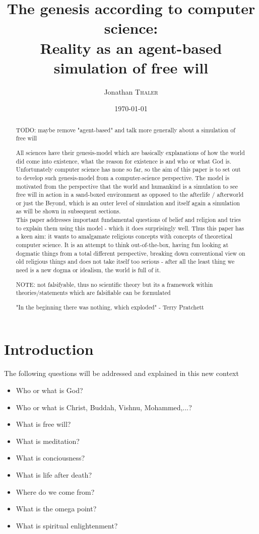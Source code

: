 \documentclass{article}
\title{The genesis according to computer science:\\Reality as an agent-based simulation of free will} %
\author{Jonathan \textsc{Thaler}} %
\date{\today} %
\begin{document}
\maketitle %

\begin{abstract}
TODO: maybe remove "agent-based" and talk more generally about a simulation of free will

All sciences have their genesis-model which are basically explanations of how the world did come into existence, what the reason for existence is and who or what God is. Unfortunately computer science has none so far, so the aim of this paper is to set out to develop such genesis-model from a computer-science perspective. The model is motivated from the perspective that the world and humankind is a simulation to see free will in action in a sand-boxed environment as opposed to the afterlife / afterworld or just the Beyond, which is an outer level of simulation and itself again a simulation as will be shown in subsequent sections. \\
This paper addresses important fundamental questions of belief and religion and tries to explain them using this model - which it does surprisingly well. Thus this paper has a keen aim: it wants to amalgamate religious concepts with concepts of theoretical computer science. It is an attempt to think out-of-the-box, having fun looking at dogmatic things from a total different perspective, breaking down conventional view on old religious things and does not take itself too serious - after all the least thing we need is a new dogma or idealism, the world is full of it.

NOTE: not falsifyable, thus no scientific theory but its a framework within theories/statements which are falsifiable can be formulated

\bigskip

"In the beginning there was nothing, which exploded" - Terry Pratchett
\end{abstract}

\section{Introduction}

The following questions will be addressed and explained in this new context

\begin{itemize}
\item Who or what is God?
\item Who or what is Christ, Buddah, Vishnu, Mohammed,...?
\item What is free will? 
\item What is meditation?
\item What is conciousness?
\item What is life after death?
\item Where do we come from?
\item What is the omega point?
\item What is spiritual enlightenment?
\end{itemize}
\end{document}

